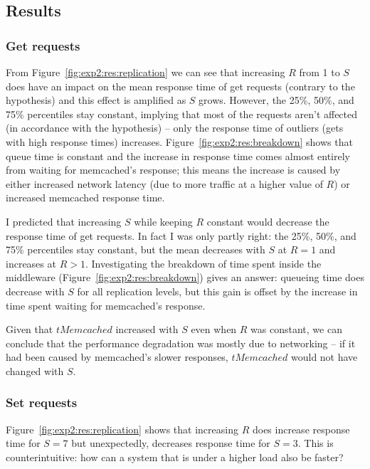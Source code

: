 \documentclass[11pt]{article}
\begin{document}
\subsection{Results}

\subsubsection{Get requests}
From Figure~\ref{fig:exp2:res:replication} we can see that increasing $R$ from 1 to $S$ does have an impact on the mean response time of get requests (contrary to the hypothesis) and this effect is amplified as $S$ grows. However, the 25\%, 50\%, and 75\% percentiles stay constant, implying that most of the requests aren't affected (in accordance with the hypothesis) -- only the response time of outliers (gets with high response times) increases. Figure~\ref{fig:exp2:res:breakdown} shows that queue time is constant and the increase in response time comes almost entirely from waiting for memcached's response; this means the increase is caused by either increased network latency (due to more traffic at a higher value of $R$) or increased memcached response time.

I predicted that increasing $S$ while keeping $R$ constant would decrease the response time of get requests. In fact I was only partly right: the 25\%, 50\%, and 75\% percentiles stay constant, but the mean decreases with $S$ at $R=1$ and increases at $R>1$. Investigating the breakdown of time spent inside the middleware (Figure~\ref{fig:exp2:res:breakdown}) gives an answer: queueing time does decrease with $S$ for all replication levels, but this gain is offset by the increase in time spent waiting for memcached's response.

Given that $tMemcached$ increased with $S$ even when $R$ was constant, we can conclude that the performance degradation was mostly due to networking -- if it had been caused by memcached's slower responses, $tMemcached$ would not have changed with $S$.

\subsubsection{Set requests}

Figure~\ref{fig:exp2:res:replication} shows that increasing $R$ does increase response time for $S=7$ but unexpectedly, decreases response time for $S=3$. This is counterintuitive: how can a system that is under a higher load also be faster?
\end{document}
